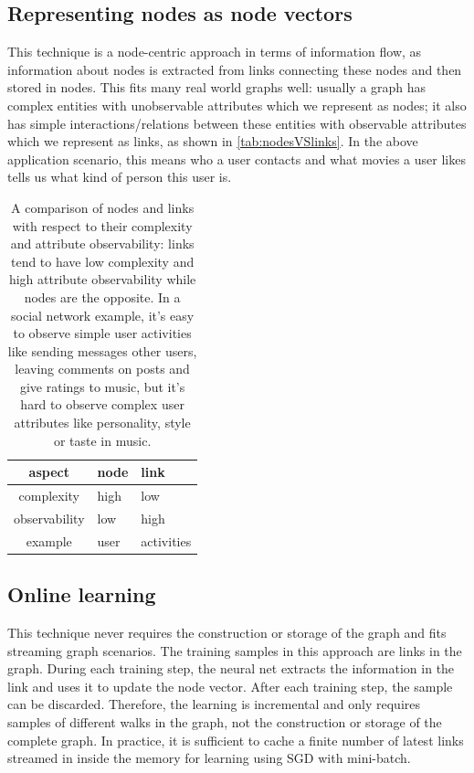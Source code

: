 \documentclass{article}
\begin{document}
\subsection{Representing nodes as node vectors}
This technique is a node-centric approach in terms of information flow, as 
information about nodes is extracted from links connecting these nodes and then 
stored in nodes.
This fits many real world graphs well: usually a graph has complex entities 
with unobservable attributes which we represent as nodes; it also has simple 
interactions/relations between these entities with observable attributes which 
we represent as links, as shown in \autoref{tab:nodesVSlinks}.
In the above application scenario, this means who a user contacts and what 
movies a user likes tells us what kind of person this user is.
\begin{table}[H]
	\centering
	\begin{tabularx}{0.5\textwidth}{ |c|X|X| } \hline
		aspect  & node & link \\ \hline
		complexity & high & low \\ \hline
		observability & low & high \\ \hline
		example & user & activities \\ \hline
	\end{tabularx}
	\caption{A comparison of nodes and links with respect to their complexity 
		and attribute observability: links tend to have low complexity and high 
		attribute observability while nodes are the opposite. In a social 
		network 
		example, it's easy to observe simple user activities like sending 
		messages 
		other users, leaving comments on posts and give ratings to music, but 
		it's 
		hard to observe complex user attributes like personality, style or 
		taste in 
		music.}
	\label{tab:nodesVSlinks}
\end{table}

\subsection{Online learning}
This technique never requires the construction or storage of the graph and fits 
streaming graph scenarios.
The training samples in this approach are links in the graph.
During each training step, the neural net extracts the information in the link 
and uses it to update the node vector.
After each training step, the sample can be discarded.
Therefore, the learning is incremental and only requires samples of different 
walks in the graph, not the construction or storage of the complete graph.
In practice, it is sufficient to cache a finite number of latest links streamed 
in inside the memory for learning using SGD with mini-batch.
\end{document}

